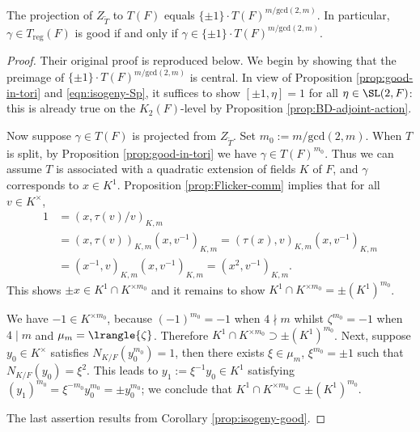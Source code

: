 \documentclass[a4paper,10pt]{article}
\begin{document}
\begin{theorem}\label{prop:good-SL2} 
	The projection of $Z_{\tilde{T}}$ to $T(F)$ equals $\{\pm 1\} \cdot T(F)^{m/\mathrm{gcd}(2,m)}$. In particular, $\gamma \in T_{\mathrm{reg}}(F)$ is good if and only if $\gamma \in \{\pm 1\} \cdot T(F)^{m/\mathrm{gcd}(2,m)}$.
\end{theorem}
\begin{proof}
	Their original proof is reproduced below. We begin by showing that the preimage of $\{\pm 1\} \cdot T(F)^{m/\mathrm{gcd}(2,m)}$ is central. In view of Proposition \ref{prop:good-in-tori} and \eqref{eqn:isogeny-Sp}, it suffices to show $[\pm 1, \eta] = 1$ for all $\eta \in \SL(2,F)$: this is already true on the $K_2(F)$-level by Proposition \ref{prop:BD-adjoint-action}.
	
	Now suppose $\gamma \in T(F)$ is projected from $Z_{\tilde{T}}$. Set $m_0 := m/\mathrm{gcd}(2,m)$. When $T$ is split, by Proposition \ref{prop:good-in-tori} we have $\gamma \in T(F)^{m_0}$. Thus we can assume $T$ is associated with a quadratic extension of fields $K$ of $F$, and $\gamma$ corresponds to $x \in K^1$. Proposition \ref{prop:Flicker-comm} implies that for all $v \in K^\times$,
	\begin{align*}
		1 & = \left( x, \tau(v)/v \right)_{K,m} \\
		& = ( x, \tau(v) )_{K,m} ( x, v^{-1})_{K,m} = ( \tau(x), v )_{K,m} ( x, v^{-1} )_{K,m} \\
		& = ( x^{-1}, v )_{K,m} ( x, v^{-1} )_{K,m} = \left( x^2, v^{-1} \right)_{K, m}.
	\end{align*}
	This shows $\pm x \in K^1 \cap K^{\times m_0}$ and it remains to show $K^1 \cap K^{\times m_0} = \pm (K^1)^{m_0}$.
	
	We have $-1 \in K^{\times m_0}$, because $(-1)^{m_0} = -1$ when $4 \nmid m$ whilst $\zeta^{m_0} = -1$ when $4 \mid m$ and $\mu_m = \lrangle{\zeta}$. Therefore $K^1 \cap K^{\times m_0} \supset \pm (K^1)^{m_0}$. Next, suppose $y_0 \in K^\times$ satisfies $N_{K/F}(y_0^{m_0}) = 1$, then there exists $\xi \in \mu_m$, $\xi^{m_0} = \pm 1$ such that $N_{K/F}(y_0) = \xi^2$. This leads to $y_1 := \xi^{-1} y_0 \in K^1$ satisfying $(y_1)^{m_0} = \xi^{-m_0} y_0^{m_0} = \pm y_0^{m_0}$; we conclude that $K^1 \cap K^{\times m_0} \subset \pm (K^1)^{m_0}$.
	
	The last assertion results from Corollary \ref{prop:isogeny-good}.
\end{proof}
\end{document}
